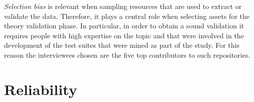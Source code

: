 \textit{Selection bias} is relevant when sampling resources that are used to extract or validate the data. Therefore, it plays a central role when selecting assets for the theory validation phase. In particular, in order to obtain a sound validation it requires people with high expertise on the topic and that were involved in the development of the test suites that were mined as part of the study. For this reason the interviewees chosen are the five top contributors to such repositories.


\section{Reliability}